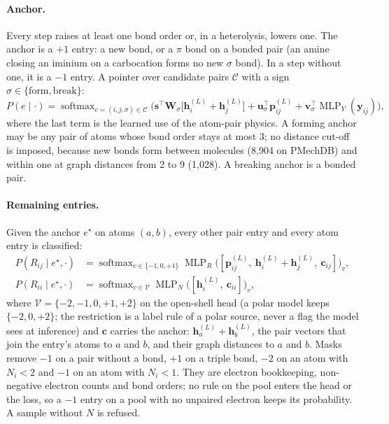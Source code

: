 \documentclass[11pt,a4paper]{article}
\newcommand{\vb}[1]{\bm{#1}}
\newcommand{\softmax}{\operatorname{softmax}}
\newcommand{\MLP}{\operatorname{MLP}}
\newcommand{\set}[1]{\{#1\}}
\begin{document}
\paragraph{Anchor.} Every step raises at least one bond order or, in a heterolysis, lowers one. The anchor is a $+1$ entry: a new bond, or a $\pi$ bond on a bonded pair (an amine closing an iminium on a carbocation forms no new $\sigma$ bond). In a step without one, it is a $-1$ entry. A pointer over candidate pairs $\mathcal{C}$ with a sign $\sigma\in\set{\text{form},\text{break}}$:
\begin{equation}
P(e\mid\cdot)=\softmax_{e=(i,j,\sigma)\in\mathcal{C}}\Big(\vb{s}^{\!\top}\vb{W}_{\sigma}\big[\vb{h}^{(L)}_i+\vb{h}^{(L)}_j\big]+\vb{u}_{\sigma}^{\!\top}\vb{p}^{(L)}_{ij}+\vb{v}_{\sigma}^{\!\top}\MLP_Y(\vb{y}_{ij})\Big),
\end{equation}
where the last term is the learned use of the atom-pair physics. A forming anchor may be any pair of atoms whose bond order stays at most $3$; no distance cut-off is imposed, because new bonds form between molecules (8,904 on PMechDB) and within one at graph distances from 2 to 9 (1,028). A breaking anchor is a bonded pair.

\paragraph{Remaining entries.} Given the anchor $e^\star$ on atoms $(a,b)$, every other pair entry and every atom entry is classified:
\begin{align}
P(R_{ij}\mid e^\star,\cdot)&=\softmax_{v\in\{-1,0,+1\}}\MLP_R\big([\vb{p}^{(L)}_{ij},\ \vb{h}^{(L)}_i+\vb{h}^{(L)}_j,\ \vb{c}_{ij}]\big)_v,\\
P(R_{ii}\mid e^\star,\cdot)&=\softmax_{v\in\mathcal{V}}\MLP_N\big([\vb{h}^{(L)}_i,\ \vb{c}_{ii}]\big)_v,
\end{align}
where $\mathcal{V}=\{-2,-1,0,+1,+2\}$ on the open-shell head (a polar model keeps $\{-2,0,+2\}$; the restriction is a label rule of a polar source, never a flag the model sees at inference) and $\vb{c}$ carries the anchor: $\vb{h}^{(L)}_a+\vb{h}^{(L)}_b$, the pair vectors that join the entry's atoms to $a$ and $b$, and their graph distances to $a$ and $b$. Masks remove $-1$ on a pair without a bond, $+1$ on a triple bond, $-2$ on an atom with $N_i<2$ and $-1$ on an atom with $N_i<1$. They are electron bookkeeping, non-negative electron counts and bond orders; no rule on the pool enters the head or the loss, so a $-1$ entry on a pool with no unpaired electron keeps its probability. A sample without $N$ is refused.
\end{document}
